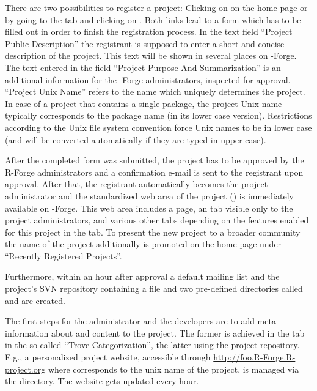 There are two possibilities to register a project: Clicking on
 on the home page or by going to the  tab and clicking on . Both links lead to a
form which has to be filled out in order to finish the registration
process. In the text field ``Project Public Description'' the
registrant is supposed to enter a short and concise description of the
project. This text will be shown in several places on \R{}-Forge. The text
entered in the field ``Project Purpose And Summarization'' is an
additional information for the \R{}-Forge administrators, inspected
for approval. ``Project Unix
Name'' refers to the name which 
uniquely determines the project. In case of a project that contains a
single \R{} package, the project Unix name typically corresponds to
the package name (in its lower case version). Restrictions according to
the Unix file system convention force Unix names to be in lower case
(and will be converted automatically if they are typed in upper case).

After the completed form was submitted, the project has to be approved
by the R-Forge administrators and a confirmation e-mail is sent to the
registrant upon approval. After that, the registrant automatically
becomes the project administrator and the standardized web area of the
project () is
immediately available on \R{}-Forge. 
This web area includes a  page, an  tab
visible only to the project administrators, and various other tabs
depending on the features enabled for this project in the 
tab. To present the new project to a broader community the name of the
project additionally is promoted on the home page under ``Recently
Registered Projects''.

Furthermore, within an hour after approval a default mailing list and
the project's SVN repository containing a  file and two
pre-defined directories called  and  are created. 

The first steps for the administrator and the developers
are to add meta information about and content to the project. The
former is achieved in the  tab in the so-called ``Trove
Categorization'', the latter using the project repository. E.g., a
personalized project website, accessible through
\url{http://foo.R-Forge.R-project.org} where  
corresponds to the unix name of the project, is managed via the
 directory. The website gets updated every hour. 

